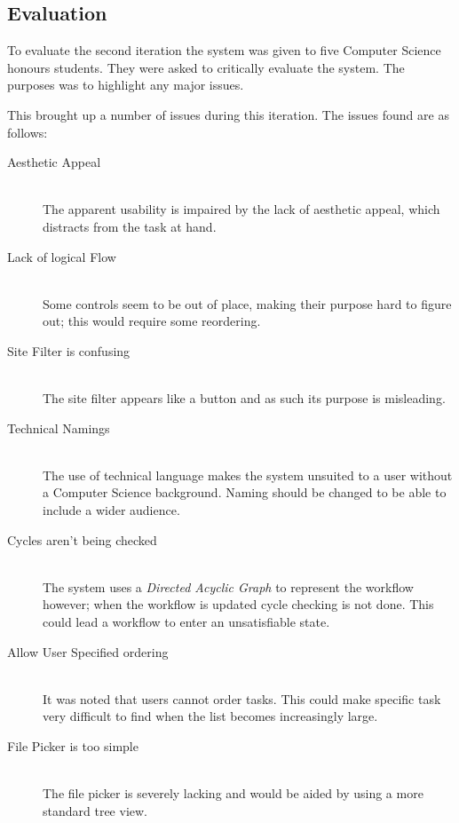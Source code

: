 \documentclass[12pt,a4paper]{report}
\begin{document}
\subsection{Evaluation}
To evaluate the second iteration the system was given to five Computer Science honours students.
They were asked to critically evaluate the system. The purposes was to highlight any major
issues.

This brought up a number of issues during this iteration. The issues found are
as follows:
\begin{description}
    \item[Aesthetic Appeal]\hfill \\
    	The apparent usability is impaired by the lack of aesthetic appeal, which distracts
        from the  task at hand\cite{Tractinsky:1997:AAU:258549.258626}.
    \item[Lack of logical Flow]\hfill \\
        Some controls seem to be out of place, making their purpose hard to
	figure out; this would require some reordering.
    \item[Site Filter is confusing] \hfill \\
        The site filter appears like a button and as such its purpose is misleading.
    \item[Technical Namings] \hfill \\
        The use of technical language makes the system unsuited to a user without
        a Computer Science background. Naming should be changed to be able to include
        a wider audience.
    \item[Cycles aren't being checked] \hfill \\
        The system uses a \emph{Directed Acyclic Graph} to represent the
	workflow however; when the workflow is updated cycle checking is not done.
	This could lead a workflow to enter an   unsatisfiable state.
    \item[Allow User Specified ordering] \hfill\\
        It was noted that users cannot order tasks. This could make specific
	task very difficult to find when the list becomes increasingly large.
    \item[File Picker is too simple] \hfill \\
        The file picker is severely lacking and would be aided by using a more standard
        tree view.
\end{description}
\end{document}
